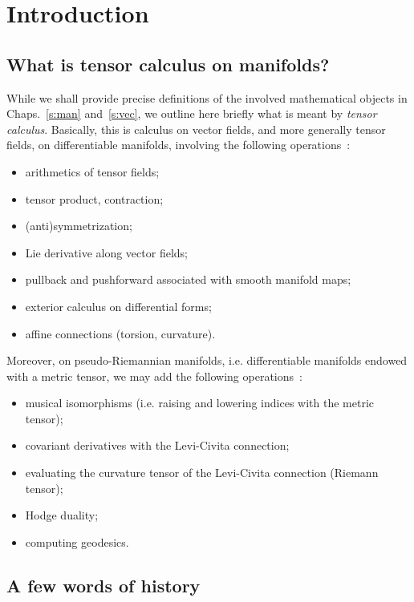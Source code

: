\chapter{Introduction} \label{s:int}

\minitoc

\section{What is tensor calculus on manifolds?}

While we shall provide precise definitions of the involved mathematical
objects in Chaps.~\ref{s:man} and~\ref{s:vec},
we outline here briefly what is meant by
\emph{tensor calculus}. Basically, this is calculus on vector fields,
and more generally tensor fields, on differentiable manifolds, involving the following operations~\cite{Lee13}:
\begin{itemize}
\item arithmetics of tensor fields;
\item tensor product, contraction;
\item (anti)symmetrization;
\item Lie derivative along vector fields;
\item pullback and pushforward associated with smooth manifold maps;
\item exterior calculus on differential forms;
\item affine connections (torsion, curvature).
\end{itemize}
Moreover, on pseudo-Riemannian manifolds, i.e. differentiable manifolds endowed
with a metric tensor, we may add the following
operations~\cite{Lee97,ONeil83}:
\begin{itemize}
\item musical isomorphisms (i.e. raising and lowering indices with the metric tensor);
\item covariant derivatives with the Levi-Civita connection;
\item evaluating the curvature tensor of the Levi-Civita connection (Riemann tensor);
\item Hodge duality;
\item computing geodesics.
\end{itemize}


\section{A few words of history}

